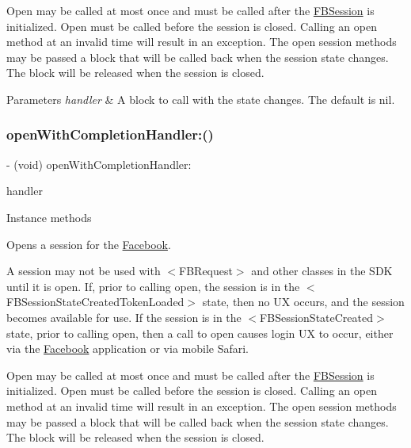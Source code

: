 Open may be called at most once and must be called after the {\ttfamily \hyperlink{interfaceFBSession}{F\+B\+Session}} is initialized. Open must be called before the session is closed. Calling an open method at an invalid time will result in an exception. The open session methods may be passed a block that will be called back when the session state changes. The block will be released when the session is closed.


\begin{DoxyParams}{Parameters}
{\em handler} & A block to call with the state changes. The default is nil. \\
\hline
\end{DoxyParams}
\mbox{\label{interfaceFBSession_a874152230789c87cd181d1f976e3715f}} 
\subsubsection{\texorpdfstring{open\+With\+Completion\+Handler\+:()}{openWithCompletionHandler:()}\hspace{0.1cm}{\footnotesize\ttfamily [4/5]}}
{\footnotesize\ttfamily -\/ (void) open\+With\+Completion\+Handler\+: \begin{DoxyParamCaption}\item[{(F\+B\+Session\+State\+Handler)}]{handler }\end{DoxyParamCaption}}

Instance methods

Opens a session for the \hyperlink{interfaceFacebook}{Facebook}.

A session may not be used with $<$\+F\+B\+Request$>$ and other classes in the S\+DK until it is open. If, prior to calling open, the session is in the $<$\+F\+B\+Session\+State\+Created\+Token\+Loaded$>$ state, then no UX occurs, and the session becomes available for use. If the session is in the $<$\+F\+B\+Session\+State\+Created$>$ state, prior to calling open, then a call to open causes login UX to occur, either via the \hyperlink{interfaceFacebook}{Facebook} application or via mobile Safari.

Open may be called at most once and must be called after the {\ttfamily \hyperlink{interfaceFBSession}{F\+B\+Session}} is initialized. Open must be called before the session is closed. Calling an open method at an invalid time will result in an exception. The open session methods may be passed a block that will be called back when the session state changes. The block will be released when the session is closed.


